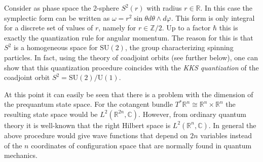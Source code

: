
    \begin{example}
        Consider as phase space the 2-sphere $S^2(r)$ with radius $r\in\mathbb{R}$. In this case the symplectic form can be written as $\omega=r^2\sin\theta d\theta\wedge d\varphi$. This form is only integral for a discrete set of values of $r$, namely for $r\in\mathbb{Z}/2$. Up to a factor $\hbar$ this is exactly the quantization rule for angular momentum. The reason for this is that $S^2$ is a homogeneous space for $\mathrm{SU}(2)$, the group characterizing spinning particles. In fact, using the theory of coadjoint orbits (see further below), one can show that this quantization procedure coincides with the \textit{KKS quantization} of the coadjoint orbit $S^2=\mathrm{SU}(2)/\mathrm{U}(1)$.
    \end{example}

    At this point it can easily be seen that there is a problem with the dimension of the prequantum state space. For the cotangent bundle $T^*\mathbb{R}^n\cong\mathbb{R}^n\times\mathbb{R}^n$ the resulting state space would be $L^2(\mathbb{R}^{2n},\mathbb{C})$. However, from ordinary quantum theory it is well-known that the right Hilbert space is $L^2(\mathbb{R}^n,\mathbb{C})$. In general the above procedure would give wave functions that depend on $2n$ variables instead of the $n$ coordinates of configuration space that are normally found in quantum mechanics.

